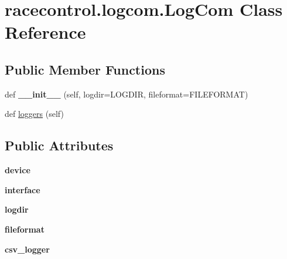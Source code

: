\hypertarget{classracecontrol_1_1logcom_1_1LogCom}{}\section{racecontrol.\+logcom.\+Log\+Com Class Reference}
\label{classracecontrol_1_1logcom_1_1LogCom}
\subsection*{Public Member Functions}
\begin{DoxyCompactItemize}
\item 
def {\bfseries \+\_\+\+\_\+init\+\_\+\+\_\+} (self, logdir=L\+O\+G\+D\+IR, fileformat=F\+I\+L\+E\+F\+O\+R\+M\+AT)\hypertarget{classracecontrol_1_1logcom_1_1LogCom_a1b7430f202da41f27eb9d471fecd4cb4}{}\label{classracecontrol_1_1logcom_1_1LogCom_a1b7430f202da41f27eb9d471fecd4cb4}

\item 
def \hyperlink{classracecontrol_1_1logcom_1_1LogCom_a5cf7d193b6c1f32ebc5a5c6ea47cd76f}{loggers} (self)
\end{DoxyCompactItemize}
\subsection*{Public Attributes}
\begin{DoxyCompactItemize}
\item 
{\bfseries device}\hypertarget{classracecontrol_1_1logcom_1_1LogCom_ae44ae38fb3b18b6cdd7892d771029f86}{}\label{classracecontrol_1_1logcom_1_1LogCom_ae44ae38fb3b18b6cdd7892d771029f86}

\item 
{\bfseries interface}\hypertarget{classracecontrol_1_1logcom_1_1LogCom_a29decd0250cfc7548f95b0855b1d1331}{}\label{classracecontrol_1_1logcom_1_1LogCom_a29decd0250cfc7548f95b0855b1d1331}

\item 
{\bfseries logdir}\hypertarget{classracecontrol_1_1logcom_1_1LogCom_af2d649bd23fb2593cb5043afcd227cc9}{}\label{classracecontrol_1_1logcom_1_1LogCom_af2d649bd23fb2593cb5043afcd227cc9}

\item 
{\bfseries fileformat}\hypertarget{classracecontrol_1_1logcom_1_1LogCom_ada32b5a1e4dbbf4ddd403609146b5524}{}\label{classracecontrol_1_1logcom_1_1LogCom_ada32b5a1e4dbbf4ddd403609146b5524}

\item 
{\bfseries csv\+\_\+logger}\hypertarget{classracecontrol_1_1logcom_1_1LogCom_a5ab3a32ec26a4c6be022d3efda81f396}{}\label{classracecontrol_1_1logcom_1_1LogCom_a5ab3a32ec26a4c6be022d3efda81f396}

\end{DoxyCompactItemize}


